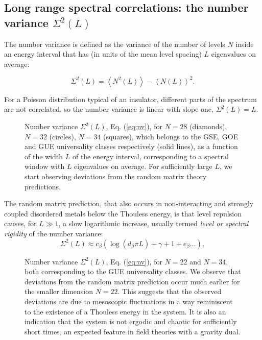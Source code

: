\documentclass[aps,showpacs,floatfix,superscriptaddress,pre,11pt]{revtex4-1}
\begin{document}
\subsection{Long range spectral correlations: the number variance $\Sigma^2(L)$} 
The number variance is defined as the variance of the number of levels $N$ inside an energy interval that has (in units of the mean level spacing) $L$ eigenvalues on average:

\begin{equation}
\Sigma^2(L) = \left\langle N^2(L)\right\rangle - \left\langle N(L)\right\rangle^2.
\label{eq:nv}
\end{equation}

For a Poisson distribution typical of an insulator, different parts of the spectrum are not correlated, so the number variance is linear with slope one, $\Sigma^2(L) = L$. 
\begin{figure}%
	\centering
	\caption{Number variance $\Sigma^2(L)$, Eq. (\ref{eq:nv}), for $N = 28$ (diamonds), $N = 32$ (circles), $N = 34$ (squares), which belongs to the GSE, GOE and GUE universality classes respectively (solid lines), as a function of the width $L$ of the energy interval, corresponding to a spectral window with $L$ eigenvalues on average.
		For sufficiently large $L$,  we start observing deviations from the random matrix theory predictions.}
	\label{fig6}
\end{figure}
The random matrix prediction, that also occurs in non-interacting \cite{altshuler1988,braun1995} and strongly coupled \cite{bertrand2016} disordered metals below the Thouless energy, is that level repulsion causes, for $L \gg 1$, a slow logarithmic increase, usually termed {\it level or spectral rigidity} of the number variance:
\begin{equation}
\Sigma^2(L) \approx c_\beta(\log(d_\beta \pi L)  + \gamma +1 +e_\beta \ldots),
\label{eq:nvwd}
\end{equation}
\begin{figure}[t]%
	\centering
	\caption{Number variance $\Sigma^2(L)$, Eq. (\ref{eq:nv}),
          for $N= 22$ and $N =34$, both corresponding to the GUE universality classes. We observe that deviations from the random matrix prediction occur much earlier for the smaller dimension $N=22$. This suggests that the observed deviations are due to mesoscopic fluctuations in a way reminiscent to the existence of a Thouless energy in the system. It is also an indication that the system is not ergodic and chaotic for sufficiently short times, an expected feature \cite{maldacena2016a,kitaev2015} in field theories with a gravity dual.}
	\label{fig7}
\end{figure}
\end{document}
